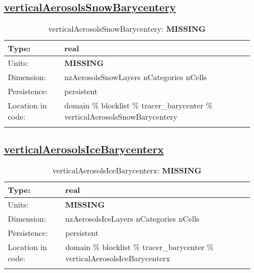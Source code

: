 \subsection[verticalAerosolsSnowBarycentery]{\hyperref[sec:var_tab_tracer_barycenter]{verticalAerosolsSnowBarycentery}}
\label{subsec:var_sec_tracer_barycenter_verticalAerosolsSnowBarycentery}
\begin{center}
\begin{longtable}{| p{2.0in} | p{4.0in} |}
        \hline 
        Type: & real \\
        \hline 
        Units: & {\bf \color{red} MISSING} \\
        \hline 
        Dimension: & nzAerosolsSnowLayers nCategories nCells \\
        \hline 
        Persistence: & persistent \\
        \hline 
         Location in code: & domain \% blocklist \% tracer\_barycenter \% verticalAerosolsSnowBarycentery \\
         \hline 
    \caption{verticalAerosolsSnowBarycentery: {\bf \color{red} MISSING}}
\end{longtable}
\end{center}
\subsection[verticalAerosolsIceBarycenterx]{\hyperref[sec:var_tab_tracer_barycenter]{verticalAerosolsIceBarycenterx}}
\label{subsec:var_sec_tracer_barycenter_verticalAerosolsIceBarycenterx}
\begin{center}
\begin{longtable}{| p{2.0in} | p{4.0in} |}
        \hline 
        Type: & real \\
        \hline 
        Units: & {\bf \color{red} MISSING} \\
        \hline 
        Dimension: & nzAerosolsIceLayers nCategories nCells \\
        \hline 
        Persistence: & persistent \\
        \hline 
         Location in code: & domain \% blocklist \% tracer\_barycenter \% verticalAerosolsIceBarycenterx \\
         \hline 
    \caption{verticalAerosolsIceBarycenterx: {\bf \color{red} MISSING}}
\end{longtable}
\end{center}
